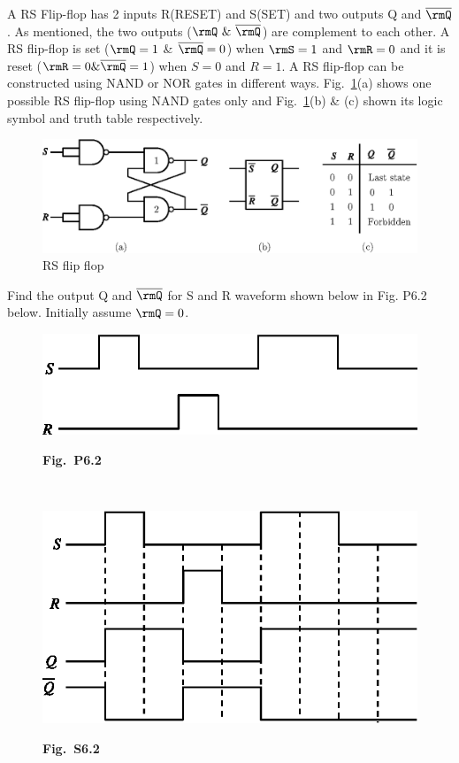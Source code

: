 A RS Flip-flop has 2 inputs R(RESET) and S(SET) and two outputs Q and
$\overline{\rmQ}$. As mentioned, the two outputs ($\rmQ~\&~\overline{\rmQ}$) are
complement to each other. A RS flip-flop is set ($\rmQ=1$ \&
$\overline{\rmQ}=0$) when $\rmS=1$ and $\rmR=0$ and it is reset
($\rmR=0 \& \overline{\rmQ}=1$) when $S=0$ and $R=1$. A RS flip-flop can be
constructed using NAND or NOR gates in different
ways. Fig.~\ref{fig6.4}(a) shows one possible RS flip-flop using NAND
gates only and Fig.~\ref{fig6.4}(b) \& (c) shown its logic symbol and
truth table respectively.
\begin{figure}[H]
\centering
\includegraphics{chap6/fig6.4.eps}
\caption{RS flip flop}\label{fig6.4}
\end{figure}

\begin{problem}\label{prob6.2}
Find the output Q and $\overline{\rmQ}$ for S and R waveform shown below in
Fig. P6.2 below. Initially assume $\rmQ =0$.
\begin{figure}[H]
\centering
\includegraphics{chap6/fig.6.4.1(a).eps}

\medskip
{\bf Fig.~P6.2}
\end{figure}
\end{problem}

\eject

\begin{solution}
~
\begin{figure}[H]
\centering
\includegraphics{chap6/sol6.4.1.eps}

\medskip
{\bf Fig.~S6.2}
\end{figure}
\end{solution}

